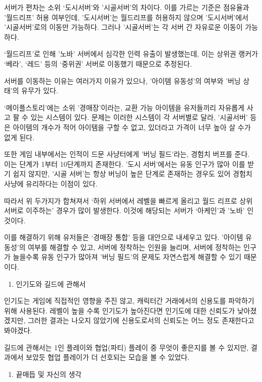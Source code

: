 \documentclass[
]{article}
\providecommand{\tightlist}{%
  \setlength{\itemsep}{0pt}\setlength{\parskip}{0pt}}
\begin{document}
서버가 편차는 소위 `도시서버'와 '시골서버'의 차이다. 이를 가르는 기준은
점유율과 '월드리프' 허용 여부인데, '도시서버'는 월드리프를 허용하지
않으며 '도시서버'에서 '시골서버'로의 이동만 가능하다. 그러나
'시골서버'는 각 서버 간 자유로운 이동이 가능하다.

`월드리프'로 인해 '노바' 서버에서 심각한 인력 유출이 발생했는데, 이는
상위권 랭커가 `베라', `레드' 등의 `중위권' 서버로 이동했기 때문으로
추정된다.

서버를 이동하는 이유는 여러가지 이유가 있으나, '아이템 유동성'의 여부와
'버닝 상태'의 유무가 있다.

`메이플스토리'에는 소위 '경매장'이라는, 교환 가능 아이템을 유저들끼리
자유롭게 사고 팔 수 있는 시스템이 있다. 문제는 이러한 시스템이 각
서버별로 달라, '시골서버' 등은 아이템의 개수가 적어 아이템을 구할 수
없고, 있더라고 가격이 너무 높아 살 수가 없게 된다.

또한 게임 내부에서는 인적이 드문 사냥터에게 '버닝 필드'라는, 경험치
버프를 준다. 이는 단계가 1부터 10단계까지 존재한다. '도시 서버'에서는
유동 인구가 많아 이를 받기 쉽지 않지만, '시골 서버'는 항상 버닝이 높은
단계로 존재하는 경우도 있어 경험치 사냥에 유리하다는 이점이 있다.

따라서 위 두가지가 합쳐져서 `하위 서버에서 레벨을 빠르게 올리고 월드
리프로 상위 서버로 이주하는' 경우가 많이 발생한다. 이것에 해당되는
서버가 `아케인'과 '노바' 인 것이다.

이를 해결하기 위해 유저들은 `경매장 통합' 등을 대안으로 내세우고 있다.
'아이템 유동성'의 여부를 해결할 수 있고, 서버에 정착하는 인원을 늘리며,
서버에 정착하는 인구가 늘을수록 유동 인구가 많아져 '버닝 필드'의 문제도
자연스럽게 해결할 수 있기 때문이다.

\begin{enumerate}
\def\labelenumi{\arabic{enumi}.}
\setcounter{enumi}{2}
\tightlist
\item
  인기도와 길드에 관해서
\end{enumerate}

인기도는 게임에 직접적인 영향을 주진 않고, 캐릭터간 거래에서의 신용도를
파악하기 위해 사용된다. 레벨이 높을 수록 인기도가 높아진다면 인기도에
대한 신뢰도가 낮아졌겠지만, 그러한 결과는 나오지 않았기에 신용도로서의
신뢰도는 어느 정도 존재한다고 봐야겠다.

길드에 관해서는 1인 플레이와 협업(파티) 플레이 중 무엇이 좋은지를 볼 수
있지만, 결과에서 보았듯 협업 플레이가 더 선호되는 모습을 볼 수 있었다.

\begin{enumerate}
\def\labelenumi{\arabic{enumi}.}
\setcounter{enumi}{3}
\tightlist
\item
  끝매듭 및 자신의 생각
\end{enumerate}
\end{document}

